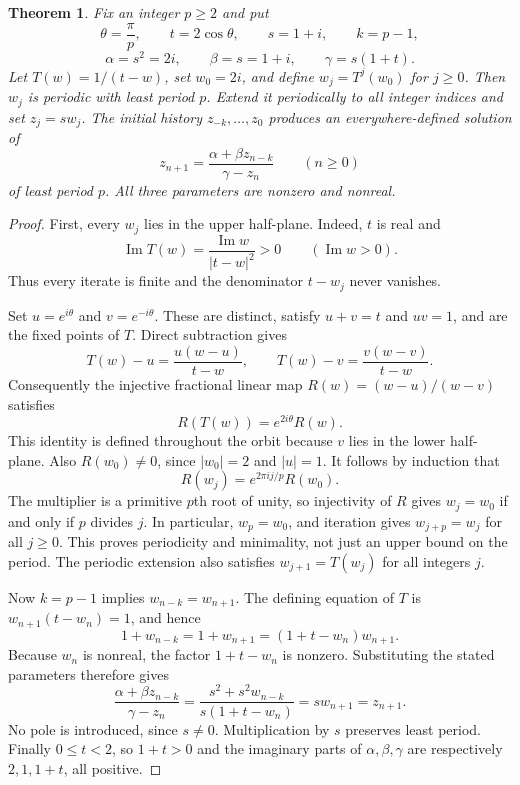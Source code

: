 \documentclass[11pt]{article}
\newtheorem{theorem}{Theorem}
\begin{document}
\begin{theorem}
Fix an integer $p\ge2$ and put
\[
 \theta=\frac{\pi}{p},\qquad t=2\cos\theta,\qquad s=1+i,
 \qquad k=p-1,
\]
\[
 \alpha=s^2=2i,\qquad \beta=s=1+i,\qquad
 \gamma=s(1+t).
\]
Let $T(w)=1/(t-w)$, set $w_0=2i$, and define $w_j=T^j(w_0)$ for
$j\ge0$. Then $w_j$ is periodic with least period $p$. Extend it
periodically to all integer indices and set $z_j=s w_j$.
The initial history $z_{-k},\ldots,z_0$ produces an everywhere-defined
solution of
\[
 z_{n+1}=\frac{\alpha+\beta z_{n-k}}{\gamma-z_n}
 \qquad(n\ge0)
\]
of least period $p$. All three parameters are nonzero and nonreal.
\end{theorem}
\begin{proof}
First, every $w_j$ lies in the upper half-plane. Indeed, $t$ is real and
\[
 \operatorname{Im}T(w)=\frac{\operatorname{Im}w}{|t-w|^2}>0
 \qquad(\operatorname{Im}w>0).
\]
Thus every iterate is finite and the denominator $t-w_j$ never vanishes.

Set $u=e^{i\theta}$ and $v=e^{-i\theta}$. These are distinct, satisfy
$u+v=t$ and $uv=1$, and are the fixed points of $T$. Direct subtraction
gives
\[
 T(w)-u=\frac{u(w-u)}{t-w},\qquad
 T(w)-v=\frac{v(w-v)}{t-w}.
\]
Consequently the injective fractional linear map
$R(w)=(w-u)/(w-v)$ satisfies
\[
 R(T(w))=e^{2i\theta}R(w).
\]
This identity is defined throughout the orbit because $v$ lies in the
lower half-plane. Also $R(w_0)\ne0$, since $|w_0|=2$ and $|u|=1$.
It follows by induction that
\[
 R(w_j)=e^{2\pi i j/p}R(w_0).
\]
The multiplier is a primitive $p$th root of unity, so injectivity of
$R$ gives $w_j=w_0$ if and only if $p$ divides $j$. In particular,
$w_p=w_0$, and iteration gives $w_{j+p}=w_j$ for all $j\ge0$.
This proves periodicity and minimality, not just an upper bound on
the period. The periodic extension also satisfies $w_{j+1}=T(w_j)$
for all integers $j$.

Now $k=p-1$ implies $w_{n-k}=w_{n+1}$. The defining equation of $T$
is $w_{n+1}(t-w_n)=1$, and hence
\[
 1+w_{n-k}=1+w_{n+1}=(1+t-w_n)w_{n+1}.
\]
Because $w_n$ is nonreal, the factor $1+t-w_n$ is nonzero.
Substituting the stated parameters therefore gives
\[
 \frac{\alpha+\beta z_{n-k}}{\gamma-z_n}
 =\frac{s^2+s^2w_{n-k}}{s(1+t-w_n)}
 =s w_{n+1}=z_{n+1}.
\]
No pole is introduced, since $s\ne0$. Multiplication by $s$ preserves
least period. Finally $0\le t<2$, so $1+t>0$ and the imaginary parts
of $\alpha,\beta,\gamma$ are respectively $2,1,1+t$, all positive.
\end{proof}
\end{document}

